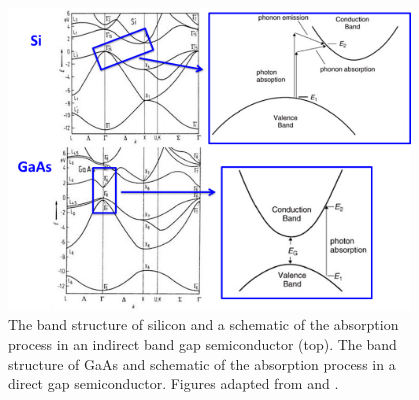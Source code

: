 \documentclass[11pt, twoside]{report}
\begin{document}
\begin{figure}[h!]
  \centering
    \includegraphics[width=0.95\textwidth]{figures/Si_and_GaAs.png}
    \caption{The band structure of silicon and a schematic of the absorption process in an indirect band gap semiconductor (top). The band structure of GaAs and schematic of the absorption process in a direct gap semiconductor. Figures adapted from  and .}
  \label{Si_and_GaAs}
\end{figure}
\end{document}
